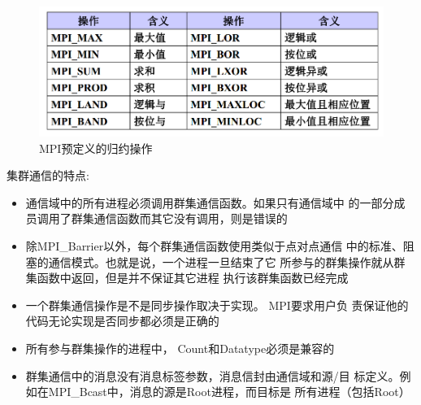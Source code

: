 \documentclass[UTF8,a4paper]{ctexart}
\begin{document}
\begin{figure}[H]
  \centering
  \includegraphics[scale = 0.3]{assets/ParallelComputing_c3eec.png}
  \caption{MPI预定义的归约操作}
\end{figure}

集群通信的特点:
\begin{itemize}
  \item 通信域中的所有进程必须调用群集通信函数。如果只有通信域中
的一部分成员调用了群集通信函数而其它没有调用，则是错误的
  \item 除MPI\_Barrier以外，每个群集通信函数使用类似于点对点通信
中的标准、阻塞的通信模式。也就是说，一个进程一旦结束了它
所参与的群集操作就从群集函数中返回，但是并不保证其它进程
执行该群集函数已经完成
  \item 一个群集通信操作是不是同步操作取决于实现。 MPI要求用户负
责保证他的代码无论实现是否同步都必须是正确的
  \item 所有参与群集操作的进程中， Count和Datatype必须是兼容的
  \item 群集通信中的消息没有消息标签参数，消息信封由通信域和源/目
标定义。例如在MPI\_Bcast中，消息的源是Root进程，而目标是
所有进程（包括Root）
\end{itemize}
\end{document}
